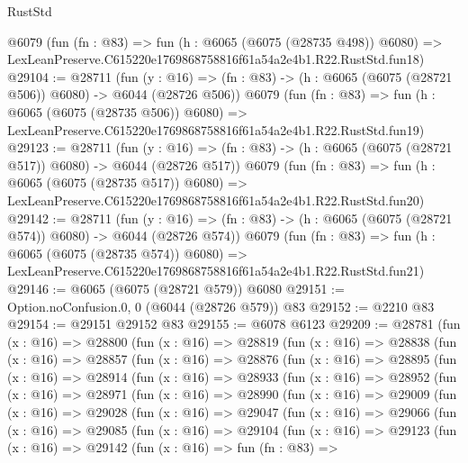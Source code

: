 \begin{lexlean}{RustStd}
\begin{coremodule}
    @6079
    (fun (fn : @83) =>
    fun (h : @6065 (@6075 (@28735 @498)) @6080) =>
    LexLeanPreserve.C615220e1769868758816f61a54a2e4b1.R22.RustStd.fun18)
@29104 := @28711
    (fun (y : @16) => (fn : @83) -> (h : @6065 (@6075 (@28721 @506)) @6080) -> @6044 (@28726 @506))
    @6079
    (fun (fn : @83) =>
    fun (h : @6065 (@6075 (@28735 @506)) @6080) =>
    LexLeanPreserve.C615220e1769868758816f61a54a2e4b1.R22.RustStd.fun19)
@29123 := @28711
    (fun (y : @16) => (fn : @83) -> (h : @6065 (@6075 (@28721 @517)) @6080) -> @6044 (@28726 @517))
    @6079
    (fun (fn : @83) =>
    fun (h : @6065 (@6075 (@28735 @517)) @6080) =>
    LexLeanPreserve.C615220e1769868758816f61a54a2e4b1.R22.RustStd.fun20)
@29142 := @28711
    (fun (y : @16) => (fn : @83) -> (h : @6065 (@6075 (@28721 @574)) @6080) -> @6044 (@28726 @574))
    @6079
    (fun (fn : @83) =>
    fun (h : @6065 (@6075 (@28735 @574)) @6080) =>
    LexLeanPreserve.C615220e1769868758816f61a54a2e4b1.R22.RustStd.fun21)
@29146 := @6065 (@6075 (@28721 @579)) @6080
@29151 := Option.noConfusion.{0, 0} (@6044 (@28726 @579)) @83
@29152 := @2210 @83
@29154 := @29151 @29152 @83
@29155 := @6078 @6123
@29209 := @28781
    (fun (x : @16) =>
    @28800
      (fun (x : @16) =>
      @28819
        (fun (x : @16) =>
        @28838
          (fun (x : @16) =>
          @28857
            (fun (x : @16) =>
            @28876
              (fun (x : @16) =>
              @28895
                (fun (x : @16) =>
                @28914
                  (fun (x : @16) =>
                  @28933
                    (fun (x : @16) =>
                    @28952
                      (fun (x : @16) =>
                      @28971
                        (fun (x : @16) =>
                        @28990
                          (fun (x : @16) =>
                          @29009
                            (fun (x : @16) =>
                            @29028
                              (fun (x : @16) =>
                              @29047
                                (fun (x : @16) =>
                                @29066
                                  (fun (x : @16) =>
                                  @29085
                                    (fun (x : @16) =>
                                    @29104
                                      (fun (x : @16) =>
                                      @29123
                                        (fun (x : @16) =>
                                        @29142
                                          (fun (x : @16) =>
                                          fun (fn : @83) =>

\end{coremodule}
\end{lexlean}
